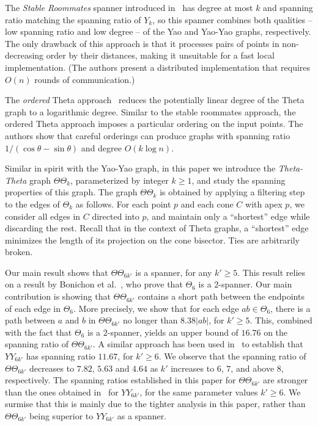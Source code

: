 \documentclass[runningheads,a4paper]{llncs}
\begin{document}
The \emph{Stable Roommates} spanner introduced in~\cite{BoseCCCKL13} has degree 
at most $k$ and spanning ratio matching the spanning ratio of $Y_k$, so this spanner combines both qualities -- low spanning ratio and low degree -- of the Yao and Yao-Yao graphs, respectively. 
The only drawback of this approach is that it processes pairs of points in non-decreasing order by their distances, making it unsuitable for a fast local implementation. (The authors present a distributed implementation that requires $O(n)$ rounds of communication.) 

The \emph{ordered} Theta approach~\cite{BoseGM04} reduces the potentially linear degree of the Theta graph to a logarithmic degree.  
Similar to the stable roommates approach, the ordered Theta approach imposes a particular ordering on the input points. 
The authors show that careful orderings can produce graphs with spanning ratio $1/(\cos\theta-\sin\theta)$ and degree $O(k \log n)$. 




Similar in spirit with the Yao-Yao graph, in this paper we introduce the \emph{Theta-Theta} graph $\Theta\Theta_k$, parameterized by integer $k \ge 1$, and study the spanning properties of this graph.  The graph $\Theta\Theta_k$ is obtained by applying a filtering step to the edges of $\Theta_k$ as follows. For each point $p$ and each cone $C$ with apex $p$, we consider all edges in $C$ directed into $p$, and maintain only a ``shortest'' edge while discarding the rest. Recall that in the context of Theta graphs, a ``shortest'' edge minimizes the length of its projection on the cone bisector.  Ties are arbitrarily broken.

Our main result shows that $\Theta\Theta_{6k'}$ is a spanner, for any $k' \ge 5$. This result relies on a result by Bonichon et al.~\cite{BGH+10}, who prove that $\Theta_6$ is a $2$-spanner. Our main contribution is showing that  $\Theta\Theta_{6k'}$ contains a short path between the endpoints of each edge in $\Theta_6$. More precisely, we show that for each edge $ab \in \Theta_6$, there is a path between $a$ and $b$ in $\Theta\Theta_{6k'}$ no longer than $8.38|ab|$, for $k' \ge 5$. This, combined with the fact that $\Theta_6$ is a $2$-spanner, yields an upper bound of $16.76$ on the spanning ratio of $\Theta\Theta_{6k'}$. 
A similar approach has been used in~\cite{DB13} to establish that $YY_{6k'}$ has spanning ratio $11.67$, for $k' \ge 6$.  
We observe that the spanning ratio of $\Theta\Theta_{6k'}$ decreases to $7.82$, $5.63$ and $4.64$ as $k'$ increases to $6$, $7$, and above $8$, respectively. 
The spanning ratios established in this paper for $\Theta\Theta_{6k'}$ are stronger than the ones obtained in~\cite{DB13} for $YY_{6k'}$, for the same parameter values $k' \ge 6$. We surmise that this is mainly due to the tighter analysis in this paper, rather than $\Theta\Theta_{6k'}$ being superior to $YY_{6k'}$ as a spanner.
\end{document}
